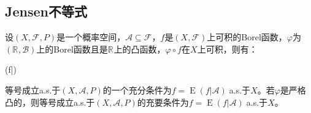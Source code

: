 \subsection{Jensen不等式}
\begin{theorem}
	设$(X,\mathscr{F},P)$是一个概率空间，$\mathscr{A}\subseteq\mathscr{F}$，$f$是$(X,\mathscr{F})$上可积的Borel函数，$\varphi$为$(\mathbb{R}^{},\mathcal{B})$上的Borel函数且是$\mathbb{R}^{}$上的凸函数，$\varphi\circ f$在$X$上可积，则有：
	\begin{inequality*}\label{ineq:Jensen}
		\leqslant{}(\varphi\circ f|)
	\end{inequality*}
	等号成立a.s.于$(X,\mathscr{A},P)$的一个充分条件为$f=\operatorname{E}(f|\mathscr{A})\;$a.s.于$X$。若$\varphi$是严格凸的，则等号成立a.s.于$(X,\mathscr{A},P)$的充要条件为$f=\operatorname{E}(f|\mathscr{A})\;$a.s.于$X$。
\end{theorem}
